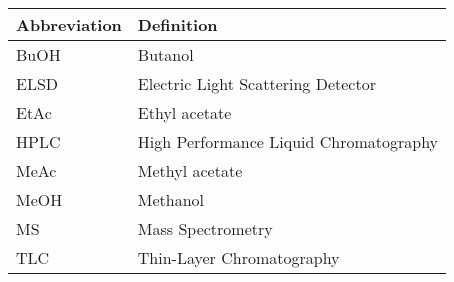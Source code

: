 
    \begin{tabularx}{\textwidth}{ll}
        \toprule
        \textbf{Abbreviation}             & \textbf{Definition}       \\
        \midrule
        BuOH        & Butanol   \\
        ELSD        & Electric Light Scattering Detector    \\
        EtAc        & Ethyl acetate     \\
        HPLC        & High Performance Liquid Chromatography    \\
        MeAc        & Methyl acetate    \\
        MeOH        & Methanol  \\
        MS          & Mass Spectrometry     \\
        TLC         & Thin-Layer Chromatography     \\
        \bottomrule
    \end{tabularx}
